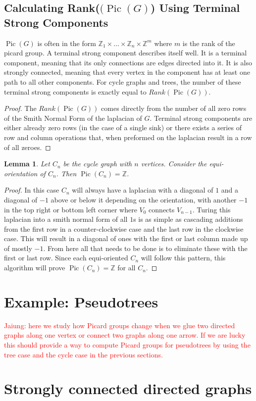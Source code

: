\documentclass[11pt,reqno]{amsart}
\DeclareMathOperator{\Pic}{Pic}
\theoremstyle{definition}
\theoremstyle{plain}
\newtheorem{lem}[mydef]{\textbf{Lemma}}
\begin{document}
	\subsection{Calculating Rank($(\Pic(G)$) Using Terminal Strong Components}
		$\Pic(G)$ is often in the form $\mathbb{Z}_1 \times \dots \times \mathbb{Z}_n \times \mathbb{Z}^m$ where $m$ is
		the rank of the picard group.  A terminal strong component describes itself well.  It is a terminal component,
		meaning that its only connections are edges directed into it.  It is also strongly connected, meaning that every
		vertex in the component has at least one path to all other components.  For cycle graphs and trees, the number
		of these terminal strong components is exactly equal to $Rank(\Pic(G))$.

		\begin{proof}
			The $Rank(\Pic(G))$ comes directly from the number of all zero rows of the Smith Normal Form of the laplacian of
			$G$.  Terminal strong components are either already zero rows (in the case of a single sink) or there
			exists a series of row and column operations that, when preformed on the laplacian result in a row of all
			zeroes.
		\end{proof}

	\begin{lem}
		Let $C_n$ be the cycle graph with $n$ vertices. Consider the equi-orientation of $C_n$.
		Then $\Pic(C_n)=\mathbb{Z}$.
	\end{lem}
	\begin{proof}
		In this case $C_n$ will always have a laplacian with a diagonal of $1$ and a diagonal of $-1$
		above or below it depending on the orientation, with another $-1$ in the top right or bottom left corner
		where $V_0$ connects $V_{n-1}$.  Turing this laplacian into a smith normal form of all $1$s is as simple as
		cascading additions from the first row in a counter-clockwise case and the last row in the clockwise case.
		This will result in a diagonal of ones with the first or last column made up of mostly $-1$.  From here
		all that needs to be done is to eliminate these with the first or last row.  Since each equi-oriented $C_n$
		will follow this pattern, this algorithm will prove $\Pic(C_n)=\mathbb{Z}$ for all $C_n$.
	\end{proof}

\section{Example: Pseudotrees}

	\textcolor{red}{Jaiung: here we study how Picard groups change when we glue two directed graphs along one vertex or
		connect two graphs along one arrow. If we are lucky this should provide a way to compute Picard groups for
		pseudotrees by using the tree case and the cycle case in the previous sections.}

\section{Strongly connected directed graphs}



\end{document}
